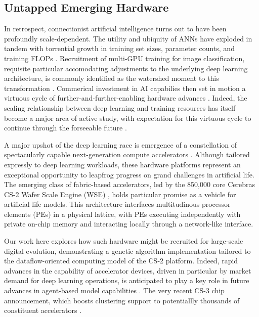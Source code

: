 \subsection{Untapped Emerging Hardware}

In retrospect, connectionist artificial intelligence turns out to have been profoundly scale-dependent.
The utility and ubiquity of ANNs have exploded in tandem with torrential growth in training set sizes, parameter counts, and training FLOPs \citep{marcus2018deep}.
Recruitment of multi-GPU training for image classification, requisite particular accomodating adjustments to the underlying deep learning architecture, is commonly identified as the watershed moment to this transformation
 \citep{krizhevsky2012imagenet}.
Commerical investment in AI capabilies then set in motion a virtuous cycle of further-and-further-enabling hardware advances \citep{jouppi2017datacenter}.
Indeed, the scaling relationship between deep learning and training resources has itself become a major area of active study, with expectation for this virtuous cycle to continue through the forseeable future \citep{kaplan2020scaling}.

A major upshot of the deep learning race is emergence of a constellation of spectacularly capable next-generation compute accelerators \citep{zhang2016cambricon,emani2021accelerating,jia2019dissecting,medina2020habana}.
Although tailored expressly to deep learning workloads, these hardware platforms represent an exceptional opportunity to leapfrog progress on grand challenges in artificial life.
The emerging class of fabric-based accelerators, led by the 850,000 core Cerebras CS-2 Wafer Scale Engine (WSE) \citep{lauterbach2021path,lie2022cerebras}, holds particular promise as a vehicle for artificial life models.
This architecture interfaces multitudinous processor elements (PEs) in a physical lattice, with PEs executing independently with private on-chip memory and interacting locally through a network-like interface.

Our work here explores how such hardware might be recruited for large-scale digital evolution, demonstrating a genetic algorithm implementation tailored to the dataflow-oriented computing model of the CS-2 platform.
Indeed, rapid advances in the capability of accelerator devices, driven in particular by market demand for deep learning operations, is anticipated to play a key role in future advances in agent-based model capabilities \citep{perumalla2022computer}.
The very recent CS-3 chip announcement, which boosts clustering support to potentiallly thousands of constituent accelerators \citep{moore2024cerebras}.


